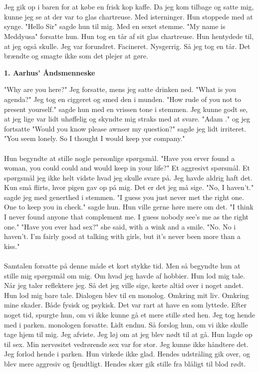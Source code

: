 \documentclass[]{article}
\begin{document}
\\ \\
Jeg gik op i baren for at købe en frisk kop kaffe. Da jeg kom tilbage og satte mig, kunne jeg se at der var to glas chartreuse. Med isterninger. Hun stoppede med at synge. "Hello Sir" sagde hun til mig. Med en sexet stemme. "My name is Meddyusa" forsatte hun. Hun tog en tår af sit glas chartreuse. Hun hentydede til, at jeg også skulle. Jeg var forundret. Facineret. Nysgerrig. Så jeg tog en tår. Det brændte og smagte ikke som det plejer at gøre.

\begin{center}
	\large\textbf{1. Aarhus' Åndsmenneske}
\end{center}

"Why are you here?" Jeg forsatte, mens jeg satte drinken ned. "What is you agenda?" Jeg tog en ciggeret og smed den i munden. "How rude of you not to present yourself." sagde hun med en vrissen tone i stemmen. Jeg kunne godt se, at jeg lige var lidt uhøffelig og skyndte mig straks med at svare. "Adam ." og jeg fortsatte "Would you know please awnser my question?" sagde jeg lidt irriteret. "You seem lonely. So I thought I would keep yor company." 
\\ \\
Hun begyndte at stille nogle personlige spørgsmål. "Have you erver found a woman, you could could and would keep in your life?" Et aggresivt spørsmål. Et spørgsmål jeg ikke helt vidste hvad jeg skulle svare på. Jeg havde aldrig haft det. Kun små flirts, hvor pigen gav op på mig. Det er det jeg må sige. "No, I haven't." sagde jeg med generthed i stemmen. "I guess you just never met the right one. One to keep you in check." sagde hun. Hun ville gerne høre mere om det. "I think I never found anyone that complement me. I guess nobody see's me as the right one." "Have you ever had sex?" she said, with a wink and a smile. "No. No i haven't. I'm fairly good at talking with girls, but it's never been more than a kiss."
\\ \\
Samtalen forsatte på denne måde et kort stykke tid. Men så begyndte hun at stille mig spørgsmål om mig. Om hvad jeg havde af hobbier. Hun lod mig tale. Når jeg taler reflektere jeg. Så det jeg ville sige, kørte altid over i noget andet. Hun lod mig bare tale. Dialogen blev til en monolog. Omkring mit liv. Omkring mine skader. Både fysisk og psykisk. Det var rart at have en som lyttede. Efter noget tid, spurgte hun, om vi ikke kunne gå et mere stille sted hen. Jeg tog hende med i parken. monologen forsatte. Lidt endnu. Så forslog hun, om vi ikke skulle tage hjem til mig. Jeg afviste. Jeg løj om at jeg blev nødt til at gå. Hun lagde op til sex. Min nervøsitet vedrørende sex var for stor.  Jeg kunne ikke håndtere det. Jeg forlod hende i parken. Hun virkede ikke glad. Hendes udstråling gik over, og blev mere aggresiv og fjendtligt. Hendes skær gik stille fra blåligt til blod rødt.
\end{document}
